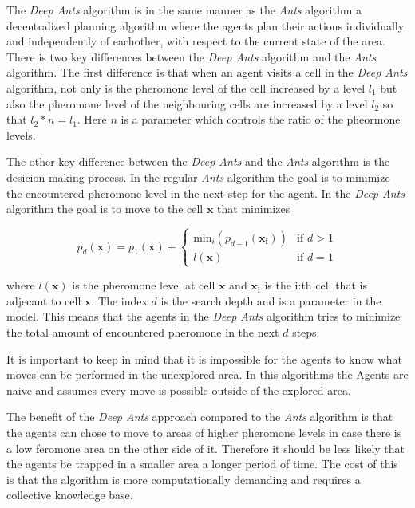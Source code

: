 \documentclass{article}
\begin{document}
The \textit{Deep Ants} algorithm is in the same manner as the \textit{Ants}
algorithm a decentralized planning algorithm where the agents plan their actions
individually and independently of eachother, with respect to the current state
of the area. There is two key differences
between the \textit{Deep Ants} algorithm and the \textit{Ants} algorithm. The
first difference is that when an agent visits a cell in the \textit{Deep Ants}
algorithm, not only is the pheromone level of the cell increased by a level $l_1$ but also the
pheromone level of the neighbouring cells are increased by a level $l_2$ so that
$l_2 * n = l_1$. Here $n$ is a parameter which controls the ratio of the
pheormone levels. 

The other key difference between the \textit{Deep Ants} and the \textit{Ants}
algorithm is the desicion making process. In the regular \textit{Ants} algorithm
the goal is to minimize the encountered pheromone level in the next step for the
agent. In the \textit{Deep Ants} algorithm the goal is to move to the cell
$\mathbf{x}$ that minimizes

$$ p_d(\mathbf{x}) = p_1(\mathbf{x}) + \begin{cases} \text{min}_i
  \left(p_{d-1}(\mathbf{x_i}) \right)  & \text{if } d > 1 \\
  l(\mathbf{x}) & \text{if } d = 1 \end{cases}$$

where $l(\mathbf{x})$ is the pheromone level at cell $\mathbf{x}$ and
$\mathbf{x_i}$ is the i:th cell that is adjecant to cell $\mathbf{x}$. The index
$d$ is the search depth and is a parameter in the model. This means that the
agents in the \textit{Deep Ants} algorithm tries to minimize the total amount of
encountered pheromone in the next $d$ steps.  

It is important to keep in mind that it is impossible for the agents to know
what moves can be performed in the unexplored area. In this algorithms the
Agents are naive and assumes every move is possible outside of the explored area.

The benefit of the \textit{Deep Ants} approach compared to the \textit{Ants}
algorithm is that the agents can chose to move to areas of higher pheromone
levels in case there is a low feromone area on the other side of it. Therefore
it should be less likely that the agents be trapped in a smaller area a longer
period of time. The cost of this is that the algorithm is more computationally
demanding and requires a collective knowledge base.
\end{document}
